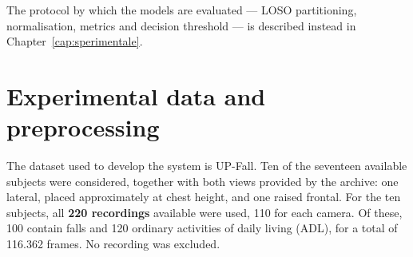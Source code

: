 \begin{table}[htbp]
\centering
\caption{Main stages of the pipeline, with their input and output.}
\label{tab:pipeline_1}
\end{table}

The protocol by which the models are evaluated --- LOSO partitioning, normalisation, metrics and decision threshold --- is described instead in Chapter~\ref{cap:sperimentale}.
\section{Experimental data and preprocessing}
\label{sec:dati}

The dataset used to develop the system is UP-Fall. Ten of the seventeen available subjects were considered, together with both views provided by the archive: one lateral, placed approximately at chest height, and one raised frontal. For the ten subjects, all \textbf{220 recordings} available were used, 110 for each camera. Of these, 100 contain falls and 120 ordinary activities of daily living (ADL), for a total of 116.362 frames. No recording was excluded.

